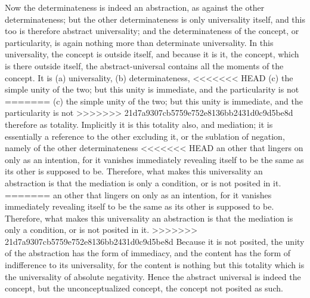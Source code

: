 Now the determinateness is indeed an abstraction,
as against the other determinateness;
but the other determinateness is only universality itself,
and this too is therefore abstract universality;
and the determinateness of the concept, or particularity,
is again nothing more than determinate universality.
In this universality, the concept is outside itself,
and because it is it, the concept,
which is there outside itself,
the abstract-universal contains
all the moments of the concept.
It is
(a) universality,
(b) determinateness,
<<<<<<< HEAD
(c) the simple unity of the two; 
but this unity is immediate, 
and the particularity is not 
=======
(c) the simple unity of the two;
but this unity is immediate,
and the particularity is not
>>>>>>> 21d7a9307cb5759e752e8136bb2431d0c9d5be8d
therefore as totality.
Implicitly it is this totality also, and mediation;
it is essentially a reference to the other excluding it,
or the sublation of negation,
namely of the other determinateness
<<<<<<< HEAD
an other that lingers on only as an intention, 
for it vanishes immediately revealing itself to be
the same as its other is supposed to be.
Therefore, what makes this universality an abstraction 
is that the mediation is only a condition, 
or is not posited in it. 
=======
an other that lingers on only as an intention,
for it vanishes immediately revealing itself to be
the same as its other is supposed to be.
Therefore, what makes this universality an abstraction
is that the mediation is only a condition,
or is not posited in it.
>>>>>>> 21d7a9307cb5759e752e8136bb2431d0c9d5be8d
Because it is not posited,
the unity of the abstraction has the form of immediacy,
and the content has the form of indifference to its universality,
for the content is nothing but this totality
which is the universality of absolute negativity.
Hence the abstract universal is indeed the concept,
but the unconceptualized concept,
the concept not posited as such.

